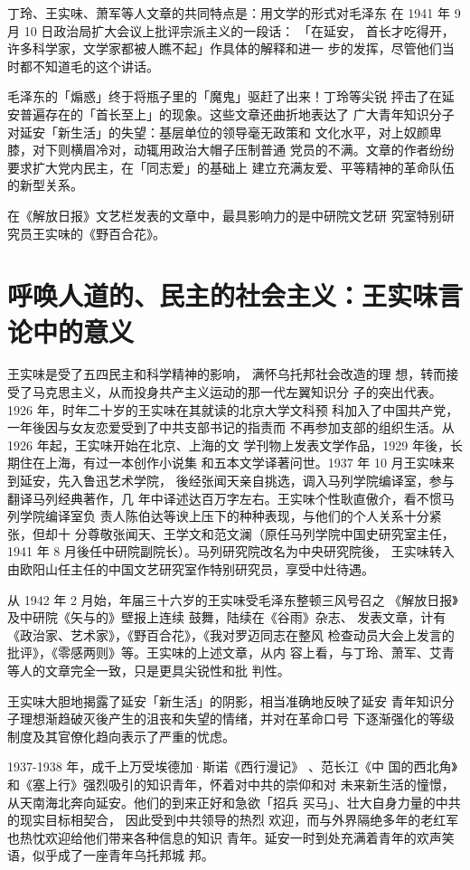 丁玲、王实味、萧军等人文章的共同特点是：用文学的形式对毛泽东
在 1941 年 9 月 10 日政治局扩大会议上批评宗派主义的一段话：
「在延安，
首长才吃得开，许多科学家，文学家都被人瞧不起」作具体的解释和进一
步的发挥，尽管他们当时都不知道毛的这个讲话。

毛泽东的「煽惑」终于将瓶子里的「魔鬼」驱赶了出来！丁玲等尖锐
抨击了在延安普遍存在的「首长至上」的现象。这些文章还曲折地表达了
广大青年知识分子对延安「新生活」的失望：基层单位的领导毫无政策和
文化水平，对上奴颜卑膝，对下则横眉冷对，动辄用政治大帽子压制普通
党员的不满。文章的作者纷纷要求扩大党内民主，在「同志爱」的基础上
建立充满友爱、平等精神的革命队伍的新型关系。

在《解放日报》文艺栏发表的文章中，最具影响力的是中研院文艺研
究室特别研究员王实味的《野百合花》。

\section{呼唤人道的、民主的社会主义：王实味言论中的意义}
王实味是受了五四民主和科学精神的影响，
满怀乌托邦社会改造的理
想，转而接受了马克思主义，从而投身共产主义运动的那一代左翼知识分
子的突出代表。1926 年，时年二十岁的王实味在其就读的北京大学文科预
科加入了中国共产党，一年後因与女友恋爱受到了中共支部书记的指责而
不再参加支部的组织生活。从 1926 年起，王实味开始在北京、上海的文
学刊物上发表文学作品，1929 年後，长期住在上海，有过一本创作小说集
和五本文学译著问世。1937 年 10 月王实味来到延安，先入鲁迅艺术学院，
後经张闻天亲自挑选，调入马列学院编译室，参与翻译马列经典著作，几
年中译述达百万字左右。王实味个性耿直傲介，看不惯马列学院编译室负
责人陈伯达等谀上压下的种种表现，与他们的个人关系十分紧张，但却十
分尊敬张闻天、王学文和范文澜（原任马列学院中国史研究室主任，1941
年 8 月後任中研院副院长）。马列研究院改名为中央研究院後，
王实味转入
由欧阳山任主任的中国文艺研究室作特别研究员，享受中灶待遇。

从 1942 年 2 月始，年届三十六岁的王实味受毛泽东整顿三风号召之
《解放日报》及中研院《矢与的》壁报上连续
鼓舞，陆续在《谷雨》杂志、
发表文章，计有《政治家、艺术家》，《野百合花》，《我对罗迈同志在整风
检查动员大会上发言的批评》，《零感两则》等。王实味的上述文章，从内
容上看，与丁玲、萧军、艾青等人的文章完全一致，只是更具尖锐性和批
判性。

王实味大胆地揭露了延安「新生活」的阴影，相当准确地反映了延安
青年知识分子理想渐趋破灭後产生的沮丧和失望的情绪，并对在革命口号
下逐渐强化的等级制度及其官僚化趋向表示了严重的忧虑。

1937-1938 年，成千上万受埃德加·斯诺《西行漫记》
、范长江《中
国的西北角》和《塞上行》强烈吸引的知识青年，怀着对中共的崇仰和对
未来新生活的憧憬，从天南海北奔向延安。他们的到来正好和急欲「招兵
买马」、壮大自身力量的中共的现实目标相契合，
因此受到中共领导的热烈
欢迎，而与外界隔绝多年的老红军也热忱欢迎给他们带来各种信息的知识
青年。延安一时到处充满着青年的欢声笑语，似乎成了一座青年乌托邦城
邦。

